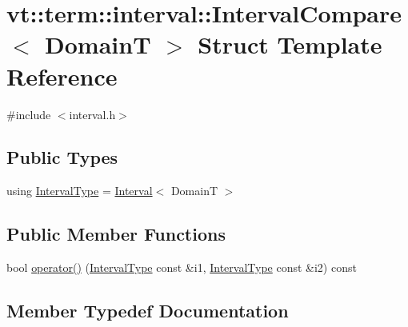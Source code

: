 \hypertarget{structvt_1_1term_1_1interval_1_1_interval_compare}{}\section{vt\+:\+:term\+:\+:interval\+:\+:Interval\+Compare$<$ DomainT $>$ Struct Template Reference}
\label{structvt_1_1term_1_1interval_1_1_interval_compare}


{\ttfamily \#include $<$interval.\+h$>$}

\subsection*{Public Types}
\begin{DoxyCompactItemize}
\item 
using \hyperlink{structvt_1_1term_1_1interval_1_1_interval_compare_a0f8be38c302892b92b68484f1925ac71}{Interval\+Type} = \hyperlink{structvt_1_1term_1_1interval_1_1_interval}{Interval}$<$ DomainT $>$
\end{DoxyCompactItemize}
\subsection*{Public Member Functions}
\begin{DoxyCompactItemize}
\item 
bool \hyperlink{structvt_1_1term_1_1interval_1_1_interval_compare_ae30957e5c338baf722853e9a0ef04fa2}{operator()} (\hyperlink{structvt_1_1term_1_1interval_1_1_interval_compare_a0f8be38c302892b92b68484f1925ac71}{Interval\+Type} const \&i1, \hyperlink{structvt_1_1term_1_1interval_1_1_interval_compare_a0f8be38c302892b92b68484f1925ac71}{Interval\+Type} const \&i2) const
\end{DoxyCompactItemize}


\subsection{Member Typedef Documentation}
\mbox{\label{structvt_1_1term_1_1interval_1_1_interval_compare_a0f8be38c302892b92b68484f1925ac71}} 
